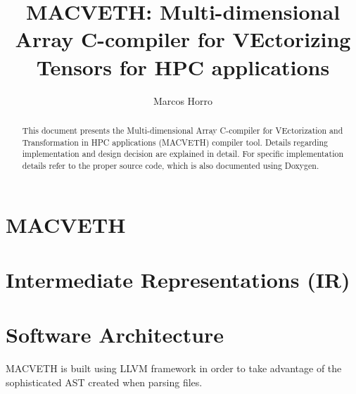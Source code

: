\documentclass[a4paper,12pt]{memoir}
\title{\textbf{MACVETH}: \textbf{M}ulti-dimensional \textbf{A}rray
    \textbf{C}-compiler for \textbf{VE}ctorizing
    \textbf{T}ensors for \textbf{H}PC applications}
\author{Marcos Horro}
\date{}
\begin{document}
\maketitle

\begin{abstract}
	This document presents the Multi-dimensional Array C-compiler for VEctorization
	and Transformation in HPC applications (MACVETH) compiler tool. Details
	regarding implementation and design decision are explained in detail. For
	specific implementation details refer to the proper source code, which is also
	documented using Doxygen.
\end{abstract}

\chapter{MACVETH}
\label{chapter:Intro}


\newpage
\chapter{Intermediate Representations (IR)}
\label{chapter:IR}


\newpage
\chapter{Software Architecture}
MACVETH is built using LLVM framework in order to take advantage of the
sophisticated AST created when parsing files.

\newpage


\end{document}

